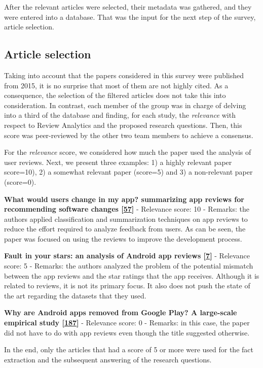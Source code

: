 \documentclass[]{book}
\begin{document}
After the relevant articles were selected, their metadata was gathered,
and they were entered into a database. That was the input for the next
step of the survey, article selection.

\subsection{Article selection}\label{article-selection}

Taking into account that the papers considered in this survey were
published from 2015, it is no surprise that most of them are not highly
cited. As a consequence, the selection of the filtered articles does not
take this into consideration. In contrast, each member of the group was
in charge of delving into a third of the database and finding, for each
study, the \emph{relevance} with respect to Review Analytics and the
proposed research questions. Then, this score was peer-reviewed by the
other two team members to achieve a consensus.

For the \emph{relevance} score, we considered how much the paper used
the analysis of user reviews. Next, we present three examples: 1) a
highly relevant paper score=10), 2) a somewhat relevant paper (score=5)
and 3) a non-relevant paper (score=0).

\textbf{What would users change in my app? summarizing app reviews for
recommending software changes
{[}\protect\hyperlink{ref-di2016would}{57}{]}} - Relevance score: 10 -
Remarks: the authors applied classification and summarization techniques
on app reviews to reduce the effort required to analyze feedback from
users. As can be seen, the paper was focused on using the reviews to
improve the development process.

\textbf{Fault in your stars: an analysis of Android app reviews
{[}\protect\hyperlink{ref-aralikatte2018fault}{7}{]}} - Relevance score:
5 - Remarks: the authors analyzed the problem of the potential mismatch
between the app reviews and the star ratings that the app receives.
Although it is related to reviews, it is not its primary focus. It also
does not push the state of the art regarding the datasets that they
used.

\textbf{Why are Android apps removed from Google Play? A large-scale
empirical study {[}\protect\hyperlink{ref-wang2018android}{187}{]}} -
Relevance score: 0 - Remarks: in this case, the paper did not have to do
with app reviews even though the title suggested otherwise.

In the end, only the articles that had a score of 5 or more were used
for the fact extraction and the subsequent answering of the research
questions.
\end{document}
